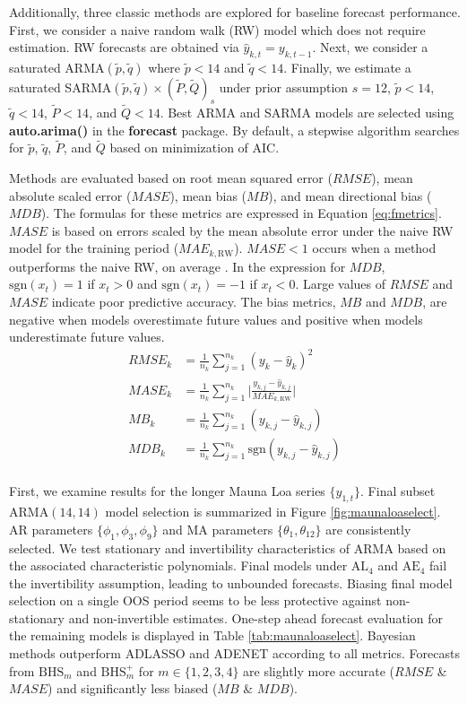Additionally, three classic methods are explored for baseline forecast performance. First, we consider a naive random walk (RW) model which does not require estimation. RW forecasts are obtained via $\hat{y}_{k,t}=y_{k,t-1}$. Next, we consider a saturated ARMA$(\tilde{p},\tilde{q})$ where $\tilde{p}<14$ and $\tilde{q}<14$. Finally, we estimate a saturated SARMA$(\tilde{p},\tilde{q})\times (\tilde{P},\tilde{Q})_s$ under prior assumption $s=12$, $\tilde{p}<14$, $\tilde{q}<14$, $\tilde{P}<14$, and $\tilde{Q}<14$. Best ARMA and SARMA models are selected using {\bf auto.arima()} in the {\bf forecast} package. By default, a stepwise algorithm searches for $\tilde{p}$, $\tilde{q}$, $\tilde{P}$, and $\tilde{Q}$ based on minimization of AIC.

Methods are evaluated based on root mean squared error ($RMSE$), mean absolute scaled error ($MASE$), mean bias ($MB$), and mean directional bias ($MDB$). The formulas for these metrics are expressed in Equation \ref{eq:fmetrics}. $MASE$ is based on errors scaled by the mean absolute error under the naive RW model for the training period ($MAE_{k,\textrm{RW}}$). $MASE<1$ occurs when a method outperforms the naive RW, on average \citep{Hyndman2006}.   In the expression for $MDB$,  $\textrm{sgn}(x_t)=1$ if $x_t>0$ and $\textrm{sgn}(x_t)=-1$ if $x_t<0$. Large values of $RMSE$ and $MASE$ indicate poor predictive accuracy. The bias metrics, $MB$ and $MDB$, are negative when models overestimate future values and positive when models underestimate future values.
\begin{equation}
\label{eq:fmetrics}
\begin{split}
	RMSE_k&=\frac{1}{n_k} \sum\limits_{j=1}^{n_k} (y_k-\hat{y}_k)^2 \\
	MASE_k&=\frac{1}{n_k} \sum\limits_{j=1}^{n_k} \Bigg|\frac{y_{k,j}-\hat{y}_{k,j}}{MAE_{k,\textrm{RW}}}\Bigg| \\
	MB_k&=\frac{1}{n_k} \sum\limits_{j=1}^{n_k} (y_{k,j}-\hat{y}_{k,j}) \\
	MDB_k&=\frac{1}{n_k} \sum\limits_{j=1}^{n_k} \textrm{sgn}(y_{k,j}-\hat{y}_{k,j})\\
\end{split}
\end{equation}


First, we examine results for the longer Mauna Loa series $\{y_{1,t}\}$. Final subset ARMA$(14,14)$ model selection is summarized in Figure \ref{fig:maunaloaselect}. AR parameters $\{\phi_1,\phi_3,\phi_9\}$ and MA parameters $\{\theta_1,\theta_{12}\}$ are consistently selected. We test stationary and invertibility characteristics of ARMA based on the associated characteristic polynomials. Final models under $\textrm{AL}_4$ and $\textrm{AE}_4$ fail the invertibility assumption, leading to unbounded forecasts. Biasing final model selection on a single OOS period seems to be less protective against non-stationary and non-invertible estimates.  One-step ahead forecast evaluation for the remaining models is displayed in Table \ref{tab:maunaloaselect}. Bayesian methods outperform ADLASSO and ADENET according to all metrics. Forecasts from $\textrm{BHS}_m$ and $\textrm{BHS}^+_m$ for $m\in\{1,2,3,4\}$ are slightly more accurate ($RMSE$ \& $MASE$) and significantly less biased ($MB$ \& $MDB$). 

